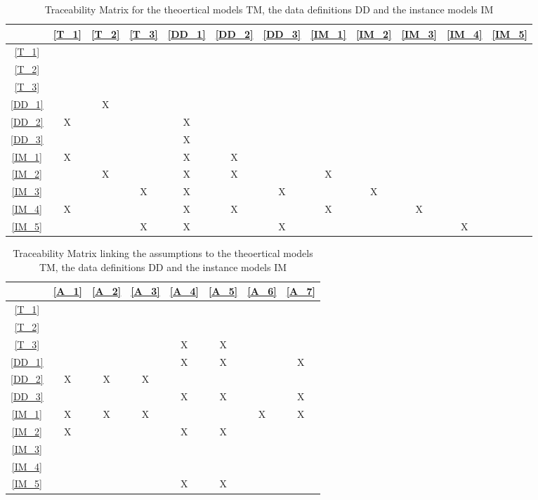 \documentclass[12pt]{article}
\begin{document}
\begin{table}[H]
\centering
\begin{tabular}{|c|c|c|c|c|c|c|c|c|c|c|c|}
\hline
	& \cref{T_1} & \cref{T_2} & \cref{T_3} & \cref{DD_1} & \cref{DD_2} & \cref{DD_3} & \cref{IM_1} & \cref{IM_2} & \cref{IM_3} & \cref{IM_4} & \cref{IM_5} \\
\hline
\cref{T_1}			& \cellcolor{gray!25} & & & & & & & & & & \\ \hline
\cref{T_2}			& & \cellcolor{gray!25} & & & & & & & & & \\ \hline
\cref{T_3}			& & & \cellcolor{gray!25} & & & & & & & & \\ \hline
\cref{DD_1}			& & X & & \cellcolor{gray!25} & & & & & & & \\ \hline
\cref{DD_2}			& X & & & X & \cellcolor{gray!25} & & & & & & \\ \hline
\cref{DD_3}			& & & & X & & \cellcolor{gray!25} & & & & & \\ \hline
\cref{IM_1}			& X & & & X & X & & \cellcolor{gray!25} & & & & \\ \hline
\cref{IM_2}			& & X & & X & X & & X & \cellcolor{gray!25} & & & \\ \hline
\cref{IM_3}			& & & X & X & & X & & X & \cellcolor{gray!25} & & \\ \hline
\cref{IM_4}			& X & & & X & X & & X & & X & \cellcolor{gray!25} & \\ \hline
\cref{IM_5}			& & & X & X & & X & & & & X & \cellcolor{gray!25} \\ \hline
\end{tabular}
\caption{Traceability Matrix for the theoertical models TM, the data definitions DD and the instance models IM}\label{tb:Matrix_1}
\end{table}

\begin{table}[H]
\centering
\begin{tabular}{|c|c|c|c|c|c|c|c|}
\hline
	& \cref{A_1} & \cref{A_2} & \cref{A_3} & \cref{A_4} & \cref{A_5} & \cref{A_6} & \cref{A_7} \\
\hline
\cref{T_1}			& & & & & & & \\ \hline
\cref{T_2}			& & & & & & & \\ \hline
\cref{T_3}			& & & & X & X & & \\ \hline
\cref{DD_1}			& & & & X & X & & X \\ \hline
\cref{DD_2}			& X & X & X & & & & \\ \hline
\cref{DD_3}			& & & & X & X & & X \\ \hline
\cref{IM_1}			& X & X & X & & & X & X \\ \hline
\cref{IM_2}			& X & & & X & X & & \\ \hline
\cref{IM_3}			& & & & & & & \\ \hline
\cref{IM_4}			& & & & & & & \\ \hline
\cref{IM_5}			& & & & X & X & & \\ \hline
\end{tabular}
\caption{Traceability Matrix linking the assumptions to the theoertical models TM, the data definitions DD and the instance models IM}\label{tb:Matrix_2}
\end{table}
\end{document}
